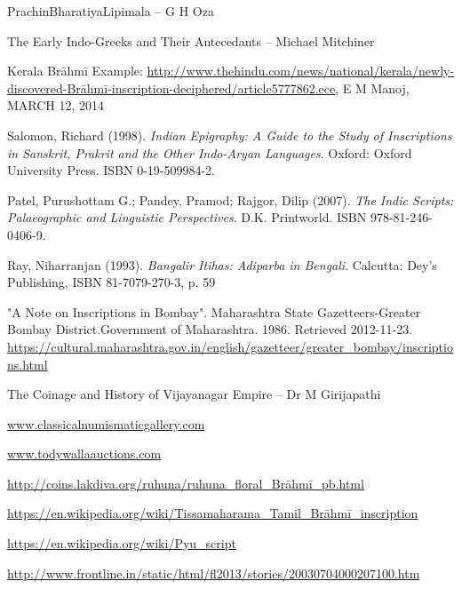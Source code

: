 \begin{thebibliography}{99}
 PrachinBharatiyaLipimala – G H Oza

  The Early Indo-Greeks and Their Antecedants – Michael Mitchiner

  Kerala Brāhmī Example: \url{http://www.thehindu.com/news/national/kerala/newly-discovered-Brāhmī-inscription-deciphered/article5777862.ece}, E M Manoj, MARCH 12, 2014

  Salomon, Richard (1998). \textit{Indian Epigraphy: A Guide to the Study of Inscriptions in Sanskrit, Prakrit and the Other Indo-Aryan Languages}. Oxford: Oxford University Press. ISBN 0-19-509984-2.

  Patel, Purushottam G.; Pandey, Pramod; Rajgor, Dilip (2007). \textit{The Indic Scripts: Palaeographic and Linguistic Perspectives}. D.K. Printworld. ISBN 978-81-246-0406-9.

  Ray, Niharranjan (1993). \textit{Bangalir Itihas: Adiparba in Bengali}. Calcutta: Dey's Publishing, ISBN 81-7079-270-3, p. 59

  "A Note on Inscriptions in Bombay". Maharashtra State Gazetteers-Greater Bombay District.Government of Maharashtra. 1986. Retrieved 2012-11-23. \url{https://cultural.maharashtra.gov.in/english/gazetteer/greater_bombay/inscriptions.html}

  The Coinage and History of Vijayanagar Empire – Dr M Girijapathi

  \url{www.classicalnumismaticgallery.com}

  \url{www.todywallaauctions.com}

  \url{http://coins.lakdiva.org/ruhuna/ruhuna_floral_Brāhmī_pb.html}

  \url{https://en.wikipedia.org/wiki/Tissamaharama_Tamil_Brāhmī_inscription}

  \url{https://en.wikipedia.org/wiki/Pyu_script}

  \url{http://www.frontline.in/static/html/fl2013/stories/20030704000207100.htm}

 \end{thebibliography}


